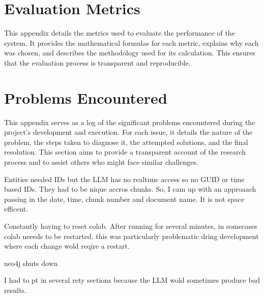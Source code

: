 \chapter{Evaluation Metrics}
This appendix details the metrics used to evaluate the performance of the system. It provides the mathematical formulas for each metric, explains why each was chosen, and describes the methodology used for its calculation. This ensures that the evaluation process is transparent and reproducible.

\chapter{Problems Encountered}
This appendix serves as a log of the significant problems encountered during the project's development and execution. For each issue, it details the nature of the problem, the steps taken to diagnose it, the attempted solutions, and the final resolution. This section aims to provide a transparent account of the research process and to assist others who might face similar challenges.

Entities needed IDs but the LLM has no realtime access so no GUID or time based IDs. They had to be nique accros chunks. So, I cam up with an approaach passing in the date, time, chunk number and document name. It is not space efficent.

Constantly having to reset colab. After running for several minutes, in somecases colab neeeds to be restarted. this was particularly problematic dring development where each change wold reqire a restart.

neo4j shuts down

I had to pt in several rety sections because the LLM wold sometimes produce bad results.